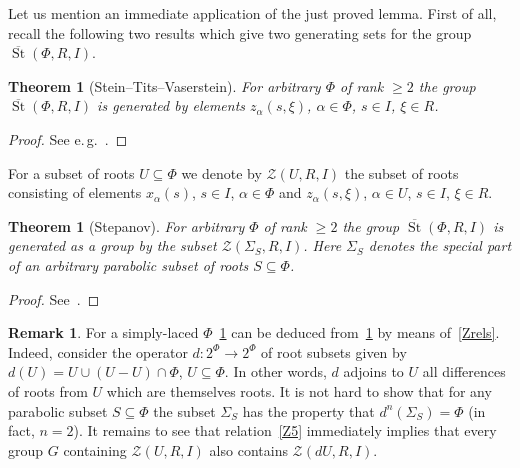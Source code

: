\documentclass[oneside, 8pt]{amsart}
\newtheorem{externaltheorem}[lemma]{Theorem}
\theoremstyle{remark}
\theoremstyle{definition}
\numberwithin{lemma}{section}
\numberwithin{prop}{section}
\numberwithin{corollary}{section}
\numberwithin{externaltheorem}{section}
\newtheorem{rem}[lemma]{Remark}
\DeclareMathOperator{\St}{St}
\numberwithin{equation}{section}
\begin{document}
Let us mention an immediate application of the just proved lemma. 
First of all, recall the following two results which give two generating sets for the group $\overline{\St}(\Phi, R, I)$.
\begin{externaltheorem}[Stein--Tits--Vaserstein] \label{thm:Tits} For arbitrary $\Phi$ of rank $\geq 2$ the group $\overline{\St}(\Phi, R, I)$ is generated by elements $z_\alpha(s, \xi)$, $\alpha \in \Phi$, $s \in I$, $\xi \in R$. \end{externaltheorem} \begin{proof} See e.\,g.~\cite[Theorem 2]{Va86}. \end{proof}

For a subset of roots $U \subseteq \Phi$ we denote by $\mathcal{Z}(U, R, I)$ the subset of roots consisting of elements $x_\alpha(s)$, $s \in I$, $\alpha \in \Phi$ and $z_\alpha(s, \xi)$, $\alpha \in U$, $s\in I$, $\xi \in R$.

\begin{externaltheorem}[Stepanov] \label{thm:Stepanov} For arbitrary $\Phi$ of rank $\geq 2$ the group $\overline{\St}(\Phi, R, I)$ is generated as a group by the subset $\mathcal{Z}(\Sigma_S, R, I)$.
 Here $\Sigma_S$ denotes the special part of an arbitrary parabolic subset of roots $S \subseteq \Phi$.
\end{externaltheorem} \begin{proof} See~\cite[Lemma~4]{S15}. \end{proof}

\begin{rem} For a simply-laced $\Phi$~\cref{thm:Stepanov} can be deduced from~\cref{thm:Tits} by means of~\cref{Zrels}. Indeed, consider the operator $d \colon 2^\Phi \to 2^\Phi$ of root subsets given by $d(U) = U \cup (U - U)\cap \Phi$, $U \subseteq \Phi$. In other words, $d$ adjoins to $U$ all differences of roots from $U$ which are themselves roots. It is not hard to show that for any parabolic subset $S \subseteq \Phi$ the subset $\Sigma_S$ has the property that $d^n(\Sigma_S) = \Phi$ (in fact, $n=2$). It remains to see that relation~\eqref{Z5} immediately implies that every group $G$ containing $\mathcal{Z}(U, R, I)$ also contains $\mathcal{Z}(dU, R, I)$. \end{rem}
\end{document}
